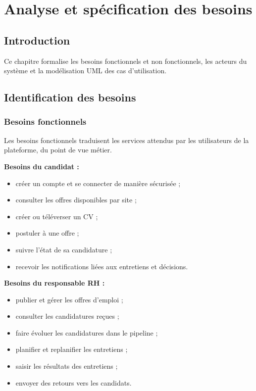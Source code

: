 
\chapter{Analyse et spécification des besoins}
\graphicspath{{Isipfe/Figures/}{diagramms/}}

\section*{Introduction}

Ce chapitre formalise les besoins fonctionnels et non fonctionnels, les
acteurs du système et la modélisation UML des cas d'utilisation.

\section{Identification des besoins}

\subsection{Besoins fonctionnels}

Les besoins fonctionnels traduisent les services attendus par les
utilisateurs de la plateforme, du point de vue métier.

\textbf{Besoins du candidat :}
\begin{itemize}
    \item créer un compte et se connecter de manière sécurisée ;
    \item consulter les offres disponibles par site ;
    \item créer ou téléverser un CV ;
    \item postuler à une offre ;
    \item suivre l'état de sa candidature ;
    \item recevoir les notifications liées aux entretiens et décisions.
\end{itemize}

\textbf{Besoins du responsable RH :}
\begin{itemize}
    \item publier et gérer les offres d'emploi ;
    \item consulter les candidatures reçues ;
    \item faire évoluer les candidatures dans le pipeline ;
    \item planifier et replanifier les entretiens ;
    \item saisir les résultats des entretiens ;
    \item envoyer des retours vers les candidats.
\end{itemize}

